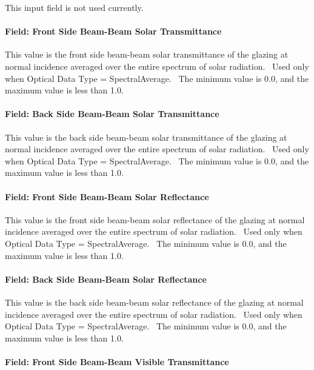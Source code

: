 This input field is not used currently.

\paragraph{Field: Front Side Beam-Beam Solar Transmittance}\label{field-front-side-beam-beam-solar-transmittance}

This value is the front side beam-beam solar transmittance of the glazing at normal incidence averaged over the entire spectrum of solar radiation.~ Used only when Optical Data Type = SpectralAverage.~ The minimum value is 0.0, and the maximum value is less than 1.0.

\paragraph{Field: Back Side Beam-Beam Solar Transmittance}\label{field-back-side-beam-beam-solar-transmittance}

This value is the back side beam-beam solar transmittance of the glazing at normal incidence averaged over the entire spectrum of solar radiation.~ Used only when Optical Data Type = SpectralAverage.~ The minimum value is 0.0, and the maximum value is less than 1.0.

\paragraph{Field: Front Side Beam-Beam Solar Reflectance}\label{field-front-side-beam-beam-solar-reflectance}

This value is the front side beam-beam solar reflectance of the glazing at normal incidence averaged over the entire spectrum of solar radiation.~ Used only when Optical Data Type = SpectralAverage.~ The minimum value is 0.0, and the maximum value is less than 1.0.

\paragraph{Field: Back Side Beam-Beam Solar Reflectance}\label{field-back-side-beam-beam-solar-reflectance}

This value is the back side beam-beam solar reflectance of the glazing at normal incidence averaged over the entire spectrum of solar radiation.~ Used only when Optical Data Type = SpectralAverage.~ The minimum value is 0.0, and the maximum value is less than 1.0.

\paragraph{Field: Front Side Beam-Beam Visible Transmittance}\label{field-front-side-beam-beam-visible-transmittance}

